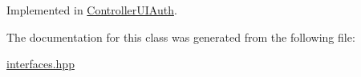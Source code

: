 Implemented in \hyperlink{class_controller_u_i_auth_a38a73726a7a7d7909cf078dd781d9dc3}{Controller\+U\+I\+Auth}.



The documentation for this class was generated from the following file\+:\begin{DoxyCompactItemize}
\item 
\hyperlink{interfaces_8hpp}{interfaces.\+hpp}\end{DoxyCompactItemize}

